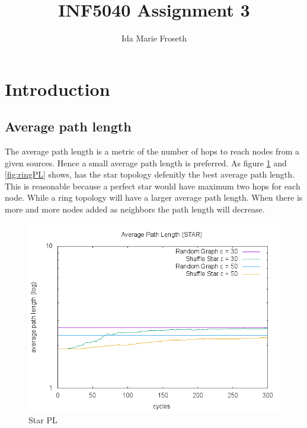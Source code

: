 \documentclass[UKenglish]{article}  %
\title{INF5040 Assignment 3}        %
\author{Ida Marie Froseth}                      %
\begin{document}
\maketitle{}
\cleardoublepage{}
\tableofcontents{}
\cleardoublepage{}

\section{Introduction}


\subsection{Average path length}
The average path length is a metric of the number of hops to reach nodes from a given sources. Hence a small average path length is preferred. As figure \ref{fig:starPL} and \ref{fig:ringPL} shows, has the star topology defenitly the best average path length. This is reasonable because a perfect star would have maximum two hops for each node. While a ring topology will have a larger average path length. When there is more and more nodes added as neighbors the path length will decrease. 
\begin{figure}
\includegraphics[scale=0.6]{plot/starPL.png}
	\caption{Star PL}
	\label{fig:starPL}
\end{figure}
\end{document}
